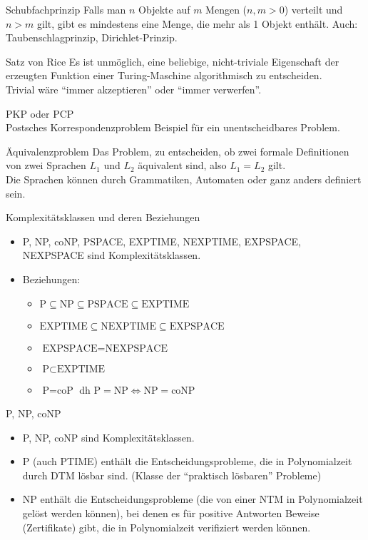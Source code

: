 \documentclass[a7paper,print,grid=both]{kartei}
\begin{document}
\begin{karte}{Schubfachprinzip}
Falls man $n$ Objekte auf $m$ Mengen ($n,m>0$) verteilt und $n>m$ gilt, gibt es mindestens eine Menge, die mehr als 1 Objekt enthält. Auch: Taubenschlagprinzip, Dirichlet-Prinzip.
\end{karte}
\begin{karte}{Satz von Rice}
Es ist unmöglich, eine beliebige, nicht-triviale Eigenschaft der erzeugten Funktion einer Turing-Maschine algorithmisch zu entscheiden.\\
Trivial wäre ``immer akzeptieren'' oder ``immer verwerfen''.
\end{karte}
\begin{karte}{PKP oder PCP\\Postsches Korrespondenzproblem}
Beispiel für ein unentscheidbares Problem.
\end{karte}
\begin{karte}{Äquivalenzproblem}
Das Problem, zu entscheiden, ob zwei formale Definitionen von zwei Sprachen $L_1$ und $L_2$ äquivalent sind, also $L_1 = L_2$ gilt.\\
Die Sprachen können durch Grammatiken, Automaten oder ganz anders definiert sein.
\end{karte}
\begin{karte}{Komplexitätsklassen und deren Beziehungen}
\begin{itemize}
    \setlength{\itemindent}{-0.5cm}
    \setlength{\itemsep}{-0.1cm}
    \item P, NP, coNP, PSPACE, EXPTIME, NEXPTIME, EXPSPACE, NEXPSPACE sind Komplexitätsklassen.
    \item Beziehungen:
    \begin{itemize}
        \item $\textrm{P} \subseteq \textrm{NP} \subseteq \textrm{PSPACE} \subseteq \textrm{EXPTIME}$
        \item $\textrm{EXPTIME} \subseteq \textrm{NEXPTIME} \subseteq \textrm{EXPSPACE}$
        \item $\textrm{EXPSPACE} = \textrm{NEXPSPACE}$
        \item $\textrm{P} \subset \textrm{EXPTIME}$
        \item $\textrm{P} = \textrm{coP}$ dh $\textrm{P} = \textrm{NP} \Leftrightarrow \textrm{NP} = \textrm{coNP}$
    \end{itemize}
\end{itemize}
\end{karte}
\begin{karte}{P, NP, coNP}
\begin{itemize}
    \setlength{\itemindent}{-0.5cm}
    \setlength{\itemsep}{-0.1cm}
    \item P, NP, coNP sind Komplexitätsklassen.
    \item P (auch PTIME) enthält die Entscheidungsprobleme, die in Polynomialzeit durch DTM lösbar sind. (Klasse der ``praktisch lösbaren'' Probleme)
    \item NP enthält die Entscheidungsprobleme (die von einer NTM in Polynomialzeit gelöst werden können), bei denen es für positive Antworten Beweise (Zertifikate) gibt, die in Polynomialzeit verifiziert werden können.
\end{itemize}
\end{karte}
\end{document}
